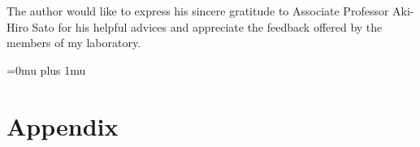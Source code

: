 \documentclass[dvipdfmx, english]{ampmt}             %
\begin{document}



\acknowledgment
The author would like to express his sincere gratitude to Associate Professor
Aki-Hiro Sato for his helpful advices and appreciate the feedback offered by the members of my laboratory.

\Urlmuskip=0mu plus 1mu\relax

\appendix

\section{Appendix}
\end{document}

